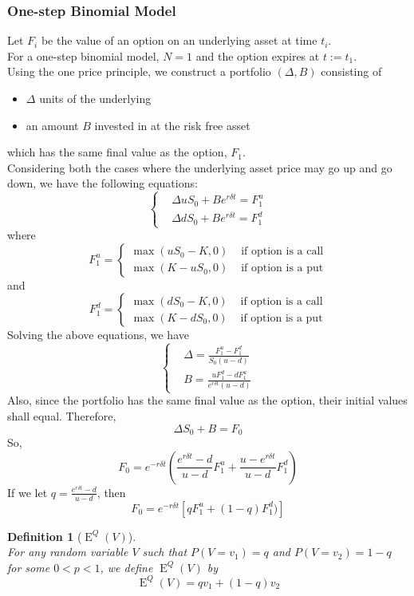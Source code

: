 \documentclass[12pt]{article}
\newtheorem{definition}{Definition}[section]
\theoremstyle{definition}
\DeclareMathOperator{\expec}{E}
\begin{document}
\subsubsection{One-step Binomial Model}
Let $F_i$ be the value of an option on an underlying asset at time $t_i$. \\
For a one-step binomial model, $N=1$ and the option expires at $t:=t_1$.\\
Using the one price principle, we construct a portfolio $(\Delta, B)$ consisting of
\begin{itemize}
	\item $\Delta$ units of the underlying
	\item an amount $B$ invested in at the risk free asset
\end{itemize}
which has the same final value as the option, $F_1$.\\
Considering both the cases where the underlying asset price may go up and go down, we have the following equations:
\[
\begin{cases}
&\Delta uS_0+Be^{r\delta t}=F_1^u\\
&\Delta dS_0+Be^{r\delta t}=F_1^d
\end{cases}
\]
where
\[
F_1^u=\begin{cases}
\max(uS_0-K, 0)&\text{ if option is a call}\\
\max(K-uS_0, 0)&\text{ if option is a put}
\end{cases}
\]
and
\[
F_1^d=\begin{cases}
\max(dS_0-K, 0)&\text{ if option is a call}\\
\max(K-dS_0, 0)&\text{ if option is a put}
\end{cases}
\]
Solving the above equations, we have
\[
\begin{cases}
&\Delta = \frac{F_1^u-F_1^d}{S_0(u-d)}\\
&B=\frac{uF_1^d-dF_1^u}{e^{r\delta t}(u-d)}
\end{cases}
\]
Also, since the portfolio has the same final value as the option, their initial values shall equal. Therefore,
\[
\Delta S_0+B=F_0
\]
So,
\[
F_0=e^{-r\delta t}\left(\frac{e^{r\delta t}-d}{u-d}F_1^u+\frac{u-e^{r\delta t}}{u-d}F_1^d\right)
\]
If we let $q = \frac{e^{r\delta t}-d}{u-d}$, then
\[
F_0 = e^{-r\delta t}[qF_1^u+(1-q)F_1^d)]
\]
\begin{definition}[{$\expec^Q(V)$}]
\hfill\\\normalfont For any random variable $V$ such that $P(V=v_1)=q$ and $P(V=v_2)=1-q$ for some $0<p<1$, we define $\expec^Q(V)$ by
\[
\expec^Q(V)=qv_1+(1-q)v_2
\]
\end{definition}
\end{document}
